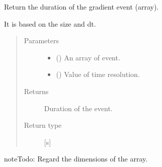 \documentclass[a4paper,10pt,english]{sphinxmanual}
\begin{document}
\begin{fulllineitems}
\label{\detokenize{autodoc/mrsprint/mrsprint.system:mrsprint.system.gradient.gradient_duration}}
Return the duration of the gradient event (array).

It is based on the size and dt.
\begin{quote}\begin{description}
\item[{Parameters}] \leavevmode\begin{itemize}
\item {} 
 () \textendash{} An array of event.

\item {} 
 (\sphinxstyleliteralemphasis{\sphinxupquote{ {[}}}\sphinxstyleliteralemphasis{\sphinxupquote{{]}}}) \textendash{} Value of time resolution.

\end{itemize}

\item[{Returns}] \leavevmode
Duration of the event.

\item[{Return type}] \leavevmode
{} {[}s{]}

\end{description}\end{quote}

\begin{sphinxadmonition}{note}{\label{autodoc/mrsprint/mrsprint.system:index-1}Todo:}
Regard the dimensions of the array.
\end{sphinxadmonition}

\end{fulllineitems}
\end{document}

